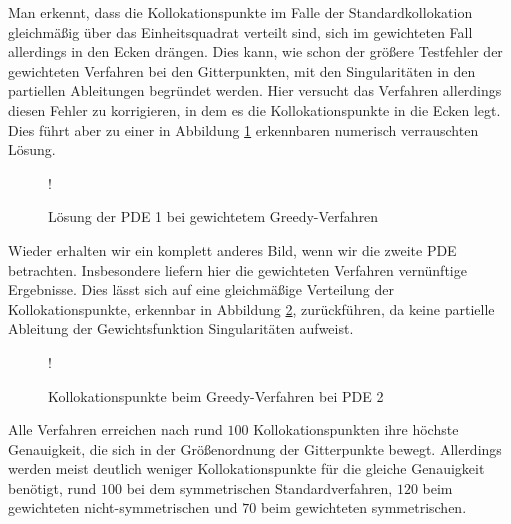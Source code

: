 Man erkennt, dass die Kollokationspunkte im Falle der Standardkollokation gleichmäßig über das Einheitsquadrat verteilt sind, sich im gewichteten Fall allerdings in den Ecken drängen. Dies kann, wie schon der größere Testfehler der gewichteten Verfahren bei den Gitterpunkten, mit den Singularitäten in den partiellen Ableitungen begründet werden. Hier versucht das Verfahren allerdings diesen Fehler zu korrigieren, in dem es die Kollokationspunkte in die Ecken legt. Dies führt aber zu einer in Abbildung \ref{fig:greedy-verrauscht} erkennbaren numerisch verrauschten Lösung. 

\begin{figure}[ht]
\centering
\resizebox {\columnwidth} {!} {

}
\caption{Lösung der \ac{PDE} 1 bei gewichtetem Greedy-Verfahren}
\label{fig:greedy-verrauscht}
\end{figure}

Wieder erhalten wir ein komplett anderes Bild, wenn wir die zweite \ac{PDE} betrachten. Insbesondere liefern hier die gewichteten Verfahren vernünftige Ergebnisse. Dies lässt sich auf eine gleichmäßige Verteilung der Kollokationspunkte, erkennbar in Abbildung \ref{fig:greedy-points2}, zurückführen, da keine partielle Ableitung der Gewichtsfunktion Singularitäten aufweist. 
\begin{figure}[ht]
\centering
\resizebox {\columnwidth} {!} {

}
\caption{Kollokationspunkte beim Greedy-Verfahren bei \ac{PDE} 2}
\label{fig:greedy-points2}
\end{figure}
Alle Verfahren erreichen nach rund $100$ Kollokationspunkten ihre höchste Genauigkeit, die sich in der Größenordnung der Gitterpunkte bewegt. Allerdings werden meist deutlich weniger Kollokationspunkte für die gleiche Genauigkeit benötigt, rund $100$ bei dem symmetrischen Standardverfahren, $120$ beim gewichteten nicht-symmetrischen und $70$ beim gewichteten symmetrischen.


